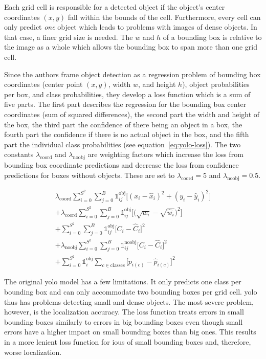 \documentclass[draft,final]{vutinfth} %
\begin{document}
Each grid cell is responsible for a detected object if the object's
center coordinates $(x,y)$ fall within the bounds of the
cell. Furthermore, every cell can only predict \emph{one} object which
leads to problems with images of dense objects. In that case, a finer
grid size is needed. The $w$ and $h$ of a bounding box is relative to
the image as a whole which allows the bounding box to span more than
one grid cell.

Since the authors frame object detection as a regression problem of
bounding box coordinates (center point $(x,y)$, width $w$, and height
$h$), object probabilities per box, and class probabilities, they
develop a loss function which is a sum of five parts. The first part
describes the regression for the bounding box center coordinates (sum
of squared differences), the second part the width and height of the
box, the third part the confidence of there being an object in a box,
the fourth part the confidence if there is no actual object in the
box, and the fifth part the individual class probabilities (see
equation~\ref{eq:yolo-loss}). The two constants
$\lambda_{\mathrm{coord}}$ and $\lambda_{\mathrm{noobj}}$ are weighting factors
which increase the loss from bounding box coordinate predictions and
decrease the loss from confidence predictions for boxes without
objects. These are set to $\lambda_{\mathrm{coord}} = 5$ and
$\lambda_{{\mathrm{noobj}}} = 0.5$.

\begin{multline}
  \label{eq:yolo-loss}
  \lambda_{\mathrm{coord}}\sum_{i=0}^{S^{2}}\sum_{j=0}^{B}\mathds{1}_{ij}^{\mathrm{obj}}\biggl[ (x_{i} - \hat{x}_{i})^{2} + (y_{i} - \hat{y}_{i})^{2} \biggr] \\
  + \lambda_{\mathrm{coord}}\sum_{i=0}^{S^{2}}\sum_{j=0}^{B}\mathds{1}_{ij}^{\mathrm{obj}}\biggl[ \biggl(\sqrt{w_{i}} - \sqrt{\hat{w}_{i}}\biggr)^{2} \biggr] \\
  + \sum_{i=0}^{S^{2}}\sum_{j=0}^{B}\mathds{1}_{ij}^{\mathrm{obj}}\biggl[ C_{i} - \hat{C}_{i} \biggr]^{2} \\
  + \lambda_{\mathrm{noobj}}\sum_{i=0}^{S^{2}}\sum_{j=0}^{B}\mathds{1}_{ij}^{\mathrm{noobj}}\biggl[ C_{i} - \hat{C}_{i} \biggr]^{2} \\
  + \sum_{i=0}^{S^{2}}\mathds{1}_{i}^{\mathrm{obj}}\sum_{c\in\mathrm{classes}}\biggl[ p_{i(c)} - \hat{p}_{i(c)} \biggr]^{2}
\end{multline}

The original \gls{yolo} model has a few limitations. It only predicts
one class per bounding box and can only accommodate two bounding boxes
per grid cell. \gls{yolo} thus has problems detecting small and dense
objects. The most severe problem, however, is the localization
accuracy. The loss function treats errors in small bounding boxes
similarly to errors in big bounding boxes even though small errors
have a higher impact on small bounding boxes than big ones. This
results in a more lenient loss function for \glspl{iou} of small
bounding boxes and, therefore, worse localization.
\end{document}
